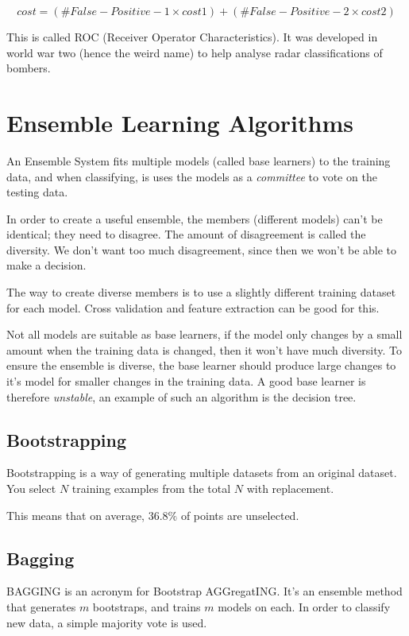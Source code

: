 \[
  cost = (\#False-Positive-1 \times cost1) + (\#False-Positive-2 \times cost2)
\]

This is called ROC (Receiver Operator Characteristics). It was developed in
world war two (hence the weird name) to help analyse radar classifications of
bombers.

\section{Ensemble Learning Algorithms}

An Ensemble System fits multiple models (called base learners) to the training
data, and when classifying, is uses the models as a \textit{committee} to vote
on the testing data.

In order to create a useful ensemble, the members (different models) can't be
identical; they need to disagree. The amount of disagreement is called the
diversity. We don't want too much disagreement, since then we won't be able to
make a decision.

The way to create diverse members is to use a slightly different training
dataset for each model. Cross validation and feature extraction can be good for
this.

Not all models are suitable as base learners, if the model only changes by a
small amount when the training data is changed, then it won't have much
diversity. To ensure the ensemble is diverse, the base learner should produce
large changes to it's model for smaller changes in the training data. A good
base learner is therefore \textit{unstable}, an example of such an algorithm is
the decision tree.

\subsection{Bootstrapping}

Bootstrapping is a way of generating multiple datasets from an original
dataset. You select $N$ training examples from the total $N$ with replacement.

This means that on average, $36.8\%$ of points are unselected.

\subsection{Bagging}

BAGGING is an acronym for Bootstrap AGGregatING. It's an ensemble method that
generates $m$ bootstraps, and trains $m$ models on each. In order to classify
new data, a simple majority vote is used.

